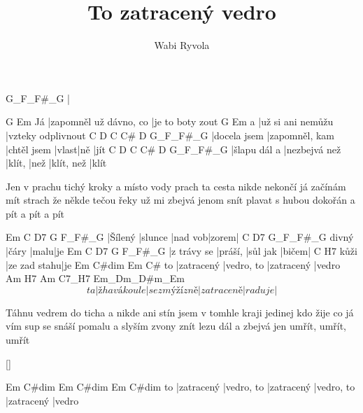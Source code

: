\documentclass{song}
\title{To zatracený vedro}
\author{Wabi Ryvola}
\begin{document}
\strophe
G_F_F#_G
|
\endstrophe

\strophe
   G                      Em
Já |zapomněl už dávno, co |je to boty zout
  G                 Em
a |už si ani nemůžu |vzteky odplivnout
C            D              C           C#    D   G_F_F#_G
|docela jsem |zapomněl, kam |chtěl jsem |vlast|ně |jít
C            D             C      C#   D          G_F_F#_G
|šlapu dál a |nezbejvá než |klít, |než |klít, než |klít
\endstrophe

\strophe*
Jen v prachu tichý kroky a místo vody prach
ta cesta nikde nekončí já začínám mít strach
že někde tečou řeky už mi zbejvá jenom snít
plavat s hubou dokořán a pít a pít a pít
\endstrophe

Em      C       D7      G     F_F#_G
|Šílený |slunce |nad vob|zorem|
      C     D7   G_F_F#_G
divný |čáry |malu|je
Em          C       D7       G     F_F#_G
|z trávy se |práší, |sůl jak |bičem|
     C            H7
kůži |ze zad stahu|je
   Em         C#dim      Em         C#
to |zatracený |vedro, to |zatracený |vedro
      Am           H7             Am         C7_H7  Em_Dm_D#m_Em
\[ ta |žhavá koule |se z mý žízně |zatraceně |raduje| \]
\endstrophe

\strophe*
Táhnu vedrem do ticha a nikde ani stín 
jsem v tomhle kraji jedinej kdo žije co já vím 
sup se snáší pomalu a slyším zvony znít 
lezu dál a zbejvá jen umřít, umřít, umřít
\endstrophe

\ref{}

\strophe
   Em         C#dim      Em         C#dim      Em         C#dim
to |zatracený |vedro, to |zatracený |vedro, to |zatracený |vedro
\endstrophe
\end{document}
